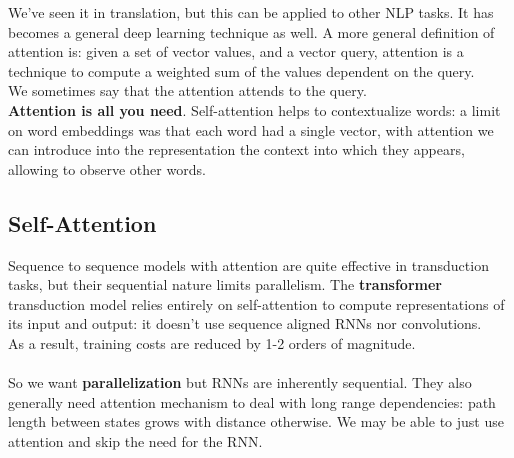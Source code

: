 \documentclass[10pt]{report}
\begin{document}
We've seen it in translation, but this can be applied to other NLP tasks. It has becomes a general deep learning technique as well. A more general definition of attention is: given a set of vector values, and a vector query, attention is a technique to compute a weighted sum of the values dependent on the query.\\
We sometimes say that the attention attends to the query.\\ %
\textbf{Attention is all you need}. Self-attention helps to contextualize words: a limit on word embeddings was that each word had a single vector, with attention we can introduce into the representation the context into which they appears, allowing to observe other words.
\subsection{Self-Attention}
Sequence to sequence models with attention are quite effective in transduction tasks, but their sequential nature limits parallelism. The \textbf{transformer} transduction model relies entirely on self-attention to compute representations of its input and output: it doesn't use sequence aligned RNNs nor convolutions.\\
As a result, training costs are reduced by 1-2 orders of magnitude.\\\\
So we want \textbf{parallelization} but RNNs are inherently sequential. They also generally need attention mechanism to deal with long range dependencies: path length between states grows with distance otherwise. We may be able to just use attention and skip the need for the RNN.
\end{document}
